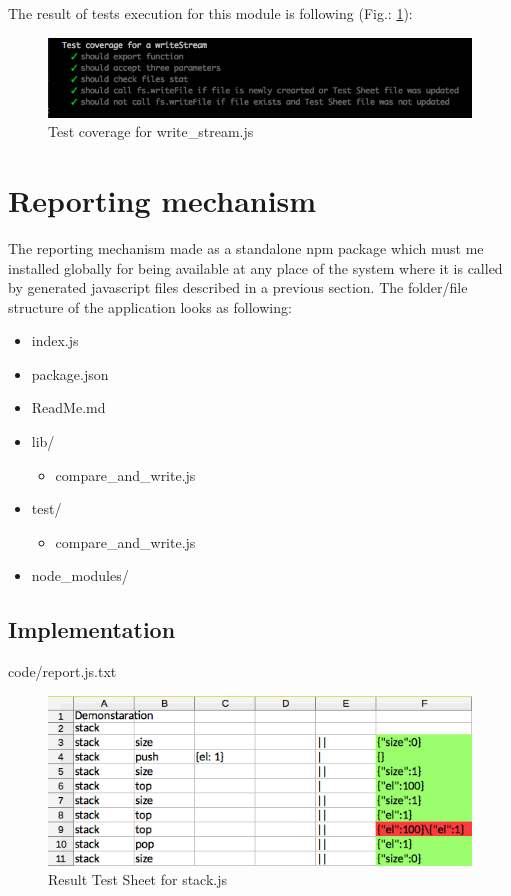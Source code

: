 The result of tests execution  for this module is following (Fig.: \ref{fig:testWrite}): 
\begin{figure}[H]
	\centering
	\includegraphics[width=\linewidth]{grafiken/testWriteStream.png}
	\caption{Test coverage for write\_stream.js}
	\label{fig:testWrite}
\end{figure}

\section{Reporting mechanism}
The reporting mechanism made as a standalone npm package which must me installed globally for being available at any place of the system where it is called by generated javascript files described in a previous section. 
The folder/file structure of the application looks as following:
\begin{itemize}
	\item index.js
	\item package.json
	\item ReadMe.md
	\item lib/
	\begin{itemize}
		\item compare\_and\_write.js
	\end{itemize}
	\item test/
	\begin{itemize}
		\item compare\_and\_write.js
	\end{itemize}
	\item node\_modules/
\end{itemize}

\subsection{Implementation}

{code/report.js.txt}

\begin{figure}[H]
	\centering
	\includegraphics[width=\linewidth]{grafiken/testSheetResult.png}
	\caption{Result Test Sheet for stack.js}
	\label{fig:resultTestSheet}
\end{figure}


